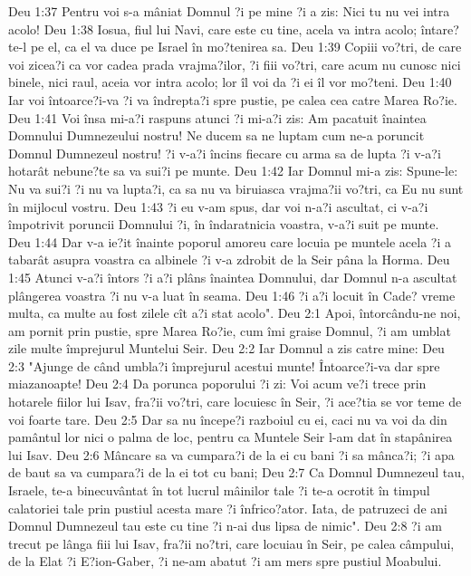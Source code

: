 Deu 1:37  Pentru voi s-a mâniat Domnul ?i pe mine ?i a zis: Nici tu nu vei intra acolo!
Deu 1:38  Iosua, fiul lui Navi, care este cu tine, acela va intra acolo; întare?te-l pe el, ca el va duce pe Israel în mo?tenirea sa.
Deu 1:39  Copiii vo?tri, de care voi zicea?i ca vor cadea prada vrajma?ilor, ?i fiii vo?tri, care acum nu cunosc nici binele, nici raul, aceia vor intra acolo; lor îl voi da ?i ei îl vor mo?teni.
Deu 1:40  Iar voi întoarce?i-va ?i va îndrepta?i spre pustie, pe calea cea catre Marea Ro?ie.
Deu 1:41  Voi însa mi-a?i raspuns atunci ?i mi-a?i zis: Am pacatuit înaintea Domnului Dumnezeului nostru! Ne ducem sa ne luptam cum ne-a poruncit Domnul Dumnezeul nostru! ?i v-a?i încins fiecare cu arma sa de lupta ?i v-a?i hotarât nebune?te sa va sui?i pe munte.
Deu 1:42  Iar Domnul mi-a zis: Spune-le: Nu va sui?i ?i nu va lupta?i, ca sa nu va biruiasca vrajma?ii vo?tri, ca Eu nu sunt în mijlocul vostru.
Deu 1:43  ?i eu v-am spus, dar voi n-a?i ascultat, ci v-a?i împotrivit poruncii Domnului ?i, în îndaratnicia voastra, v-a?i suit pe munte.
Deu 1:44  Dar v-a ie?it înainte poporul amoreu care locuia pe muntele acela ?i a tabarât asupra voastra ca albinele ?i v-a zdrobit de la Seir pâna la Horma.
Deu 1:45  Atunci v-a?i întors ?i a?i plâns înaintea Domnului, dar Domnul n-a ascultat plângerea voastra ?i nu v-a luat în seama.
Deu 1:46  ?i a?i locuit în Cade? vreme multa, ca multe au fost zilele cît a?i stat acolo".
Deu 2:1  Apoi, întorcându-ne noi, am pornit prin pustie, spre Marea Ro?ie, cum îmi graise Domnul, ?i am umblat zile multe împrejurul Muntelui Seir.
Deu 2:2  Iar Domnul a zis catre mine:
Deu 2:3  "Ajunge de când umbla?i împrejurul acestui munte! Întoarce?i-va dar spre miazanoapte!
Deu 2:4  Da porunca poporului ?i zi: Voi acum ve?i trece prin hotarele fiilor lui Isav, fra?ii vo?tri, care locuiesc în Seir, ?i ace?tia se vor teme de voi foarte tare.
Deu 2:5  Dar sa nu începe?i razboiul cu ei, caci nu va voi da din pamântul lor nici o palma de loc, pentru ca Muntele Seir l-am dat în stapânirea lui Isav.
Deu 2:6  Mâncare sa va cumpara?i de la ei cu bani ?i sa mânca?i; ?i apa de baut sa va cumpara?i de la ei tot cu bani;
Deu 2:7  Ca Domnul Dumnezeul tau, Israele, te-a binecuvântat în tot lucrul mâinilor tale ?i te-a ocrotit în timpul calatoriei tale prin pustiul acesta mare ?i înfrico?ator. Iata, de patruzeci de ani Domnul Dumnezeul tau este cu tine ?i n-ai dus lipsa de nimic".
Deu 2:8  ?i am trecut pe lânga fiii lui Isav, fra?ii no?tri, care locuiau în Seir, pe calea câmpului, de la Elat ?i E?ion-Gaber, ?i ne-am abatut ?i am mers spre pustiul Moabului.
